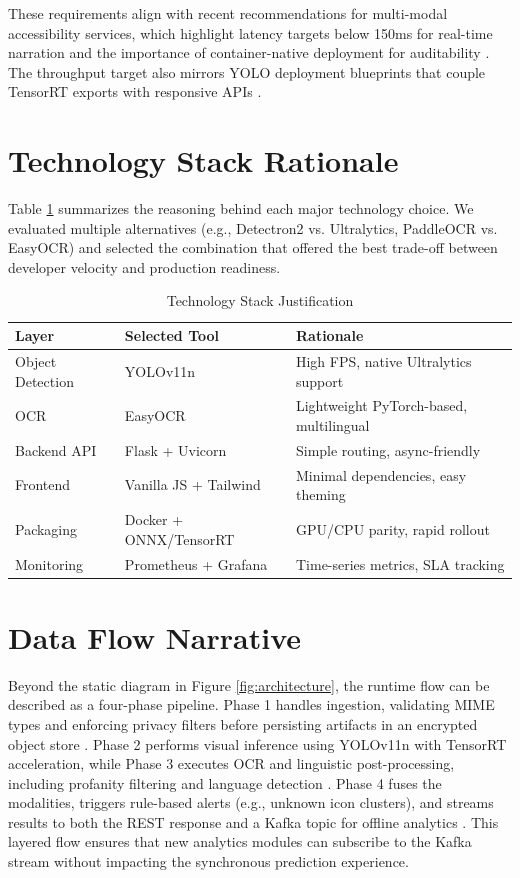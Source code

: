 \documentclass[11pt,a4paper]{report}
\begin{document}
These requirements align with recent recommendations for multi-modal accessibility services, which highlight latency targets below 150ms for real-time narration and the importance of container-native deployment for auditability \cite{multimodalaccessibility}\cite{docker}. The throughput target also mirrors YOLO deployment blueprints that couple TensorRT exports with responsive APIs \cite{yolov11}\cite{uiautomation}. 

\section{Technology Stack Rationale}
Table \ref{tab:stack} summarizes the reasoning behind each major technology choice. We evaluated multiple alternatives (e.g., Detectron2 vs. Ultralytics, PaddleOCR vs. EasyOCR) and selected the combination that offered the best trade-off between developer velocity and production readiness.

\begin{table}[H]
    \centering
    \caption{Technology Stack Justification}
    \label{tab:stack}
    \begin{tabular}{lll}
    	\toprule
    	\textbf{Layer} & \textbf{Selected Tool} & \textbf{Rationale} \\
        \midrule
        Object Detection & YOLOv11n & High FPS, native Ultralytics support \cite{yolov11} \\
        OCR & EasyOCR & Lightweight PyTorch-based, multilingual \cite{easyocr} \\
        Backend API & Flask + Uvicorn & Simple routing, async-friendly \cite{pytorch}\cite{docker} \\
        Frontend & Vanilla JS + Tailwind & Minimal dependencies, easy theming \\
        Packaging & Docker + ONNX/TensorRT & GPU/CPU parity, rapid rollout \cite{docker}\cite{yolov11} \\
        Monitoring & Prometheus + Grafana & Time-series metrics, SLA tracking \cite{uiautomation} \\
        \bottomrule
    \end{tabular}
\end{table}

\section{Data Flow Narrative}
Beyond the static diagram in Figure \ref{fig:architecture}, the runtime flow can be described as a four-phase pipeline. Phase 1 handles ingestion, validating MIME types and enforcing privacy filters before persisting artifacts in an encrypted object store \cite{docker}. Phase 2 performs visual inference using YOLOv11n with TensorRT acceleration, while Phase 3 executes OCR and linguistic post-processing, including profanity filtering and language detection \cite{easyocr}. Phase 4 fuses the modalities, triggers rule-based alerts (e.g., unknown icon clusters), and streams results to both the REST response and a Kafka topic for offline analytics \cite{uiautomation}. This layered flow ensures that new analytics modules can subscribe to the Kafka stream without impacting the synchronous prediction experience.
\end{document}

